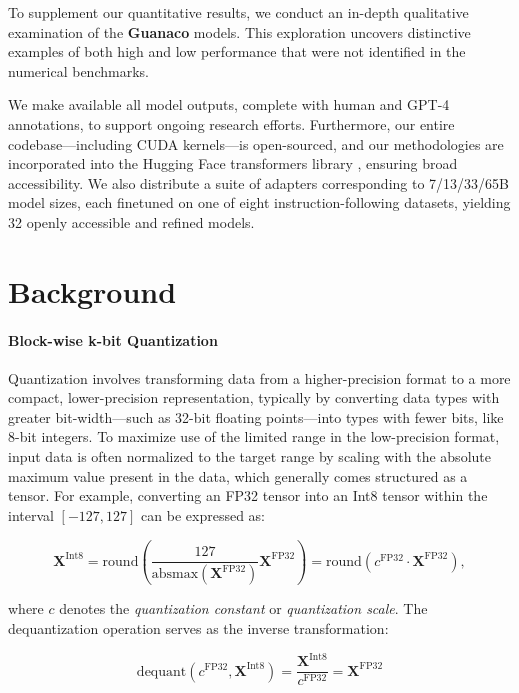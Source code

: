 To supplement our quantitative results, we conduct an in-depth qualitative examination of the \textbf{Guanaco} models. This exploration uncovers distinctive examples of both high and low performance that were not identified in the numerical benchmarks.

We make available all model outputs, complete with human and GPT-4 annotations, to support ongoing research efforts. Furthermore, our entire codebase—including CUDA kernels—is open-sourced, and our methodologies are incorporated into the Hugging Face transformers library \citep{wolf2019huggingface}, ensuring broad accessibility. We also distribute a suite of adapters corresponding to 7/13/33/65B model sizes, each finetuned on one of eight instruction-following datasets, yielding 32 openly accessible and refined models.

\section{Background}
\paragraph{Block-wise k-bit Quantization} Quantization involves transforming data from a higher-precision format to a more compact, lower-precision representation, typically by converting data types with greater bit-width—such as 32-bit floating points—into types with fewer bits, like 8-bit integers. To maximize use of the limited range in the low-precision format, input data is often normalized to the target range by scaling with the absolute maximum value present in the data, which generally comes structured as a tensor. For example, converting an FP32 tensor into an Int8 tensor within the interval $[-127, 127]$ can be expressed as:

\begin{equation}
    \mathbf{X}^{ \text{Int8}} = \text{round}\left( \frac{127}{{\text{absmax}}(\mathbf{X}^{{\text{FP32}}})}\mathbf{X}^{{\text{FP32}}} \right) = \text{round}(c^{\text{FP32}}\cdot \mathbf{X}^{{\text{FP32}}}),
\end{equation}

where $c$ denotes the {\em quantization constant} or {\em quantization scale}. The dequantization operation serves as the inverse transformation:

\begin{equation}
    \text{dequant}(c^{\text{FP32}}, \mathbf{X}^{\text{Int8}}) = \frac{\mathbf{X}^{\text{Int8}}}{c^{\text{FP32}}} = \mathbf{X}^{\text{FP32}}
\end{equation}

